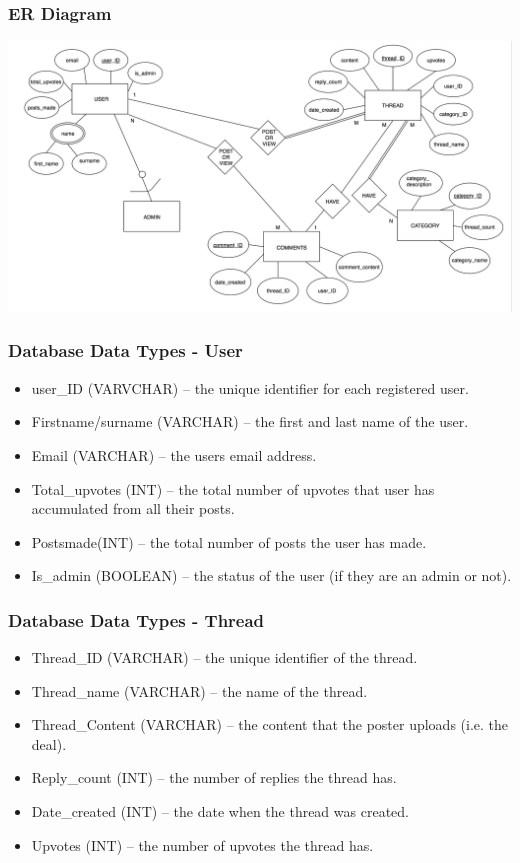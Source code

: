 \documentclass{beamer}
\begin{document}
\begin{frame}
	\frametitle{ER Diagram}
	\includegraphics[width=\textwidth,height=\textheight,keepaspectratio]{er-dia}
\end{frame}

\begin{frame}
	\frametitle{Database Data Types - User}
	\begin{itemize}
		\item user\_ID (VARVCHAR) – the unique identifier for each registered user.
		\item Firstname/surname (VARCHAR) – the first and last name of the user.
		\item Email (VARCHAR) – the users email address.
		\item Total\_upvotes (INT) – the total number of upvotes that user has accumulated from all their posts.
		\item Posts\-made(INT) – the total number of posts the user has made.
		\item Is\_admin (BOOLEAN) – the status of the user (if they are an admin or not).
	\end{itemize}
\end{frame}

\begin{frame}
	\frametitle{Database Data Types - Thread}
	\begin{itemize}
		\item Thread\_ID (VARCHAR) – the unique identifier of the thread.
		\item Thread\_name (VARCHAR) – the name of the thread.
		\item Thread\_Content (VARCHAR) – the content that the poster uploads (i.e. the deal).
		\item Reply\_count (INT) – the number of replies the thread has.
		\item Date\_created (INT) – the date when the thread was created.
		\item Upvotes (INT) – the number of upvotes the thread has.
	\end{itemize}
\end{frame}
\end{document}
